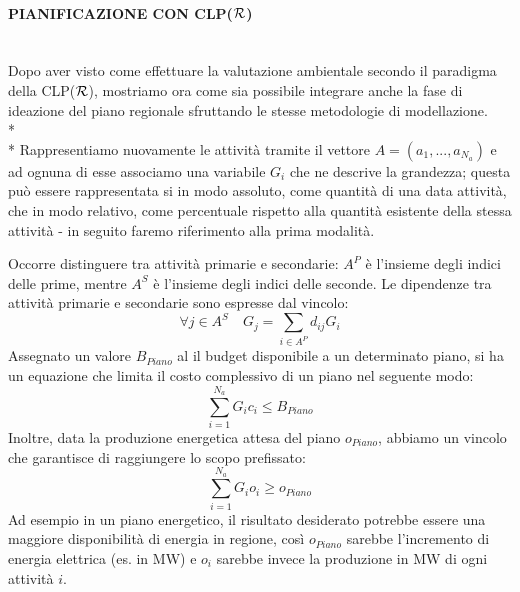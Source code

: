 \documentclass[12pt,a4paper,openright,twoside]{report}
\newcommand{\myparagraph}[1]{\paragraph{#1}\mbox{}\\}
\newcommand{\clpr}{CLP({\ensuremath{\cal R}})}
\begin{document}
\myparagraph{PIANIFICAZIONE CON \clpr}

Dopo aver visto come effettuare la valutazione ambientale secondo il paradigma della \clpr, mostriamo ora come sia possibile integrare anche la fase di ideazione del piano regionale sfruttando le stesse metodologie di modellazione.
\\*\\*
Rappresentiamo nuovamente le attività tramite il vettore $A = (a_1,...,a_{N_a})$ e ad ognuna di esse associamo una variabile $G_i$ che ne descrive la grandezza; questa può essere rappresentata si in modo assoluto, come quantità di una data attività, che in modo relativo, come percentuale rispetto alla quantità esistente della stessa attività - in seguito faremo riferimento alla prima modalità.

Occorre distinguere tra attività primarie e secondarie: $A^P$ è l'insieme degli indici delle prime, mentre $A^S$ è l'insieme degli indici delle seconde. Le dipendenze tra attività primarie e secondarie sono espresse dal vincolo:
\begin{equation}
\label{eq:primSec}
	\forall j \in A^S  \quad  G_j = \sum_{i \in A^P} d_{ij} G_i
\end{equation}
Assegnato un valore $B_{Piano}$ al il budget disponibile a un determinato piano, si ha un equazione che limita il costo complessivo di un piano nel seguente modo:
\begin{equation}
\label{eq:costoTotPrimSec}
	\sum_{i=1}^{N_a} G_i c_i \leq B_{Piano}
\end{equation}  
Inoltre, data la produzione energetica attesa del piano $o_{Piano}$, abbiamo un vincolo che garantisce di raggiungere lo scopo prefissato:
\begin{equation}
\label{eq:expOut}
	\sum_{i=1}^{N_a} G_i o_i \geq o_{Piano}
\end{equation}  
Ad esempio in un piano energetico, il risultato desiderato potrebbe essere una maggiore disponibilità di energia in regione, così $o_{Piano}$ sarebbe l'incremento di energia elettrica (es. in MW) e $o_i$ sarebbe invece la produzione in MW di ogni attività $i$.
\end{document}
